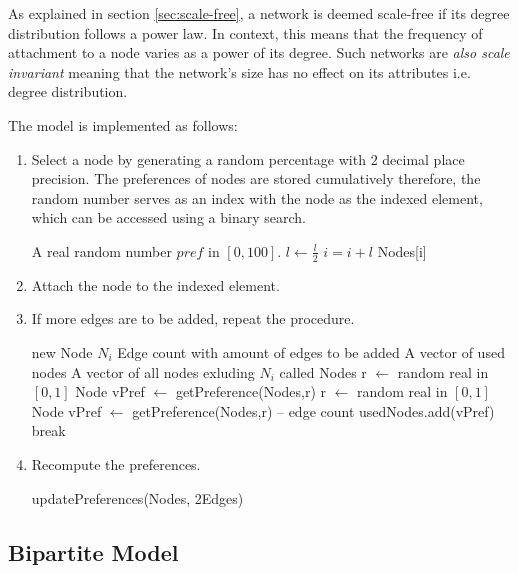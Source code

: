 \documentclass[a4paper,11pt,titlepage]{article}
\begin{document}
As explained in section \ref{sec:scale-free}, a network is deemed scale-free if
its degree distribution follows a power law.  In context, this means that the
frequency of attachment to a node varies as a power of its degree. Such networks
are \emph{also scale invariant} meaning that the network's size has no effect on
its attributes i.e. degree distribution.

The model is implemented as follows:
\begin{enumerate}
\item
  Select a node by generating a random percentage with $2$ decimal place
  precision.  The preferences of nodes are stored cumulatively therefore, the
  random number serves as an index with the node as the indexed element, which
  can be accessed using a binary search.
  \begin{algorithmic}
    \REQUIRE A real random number $pref$ in $[0,100]$.
	      \STATE $l \gets \frac{l}{2}$
		\STATE $i = i+l$
		\ENDIF
	\ENDIF
	\ENDFOR
\ENDFOR
\RETURN Nodes[i]
\end{algorithmic}
  \item Attach the node to the indexed element.
  \item If more edges are to be added, repeat the procedure.

\begin{algorithmic}
\REQUIRE  new Node $N_i$
\REQUIRE Edge count with amount of edges to be added
\REQUIRE A vector of used nodes
\REQUIRE A vector of all nodes exluding $N_i$ called Nodes
	\STATE r $\gets$ random real in $[0, 1]$
	\STATE Node vPref $\gets$ getPreference(Nodes,r)
		\STATE r $\gets$ random real in $[0, 1]$
		\STATE Node vPref $\gets$ getPreference(Nodes,r)
	\ENDWHILE
	\STATE -- edge count
	\STATE usedNodes.add(vPref)
		\STATE break
	\ENDIF
\ENDWHILE

\end{algorithmic}
  \item Recompute the preferences.
\begin{algorithmic}
	\STATE updatePreferences(Nodes, 2Edges)
\end{algorithmic}
\end{enumerate}




\subsection{Bipartite Model}
\end{document}
